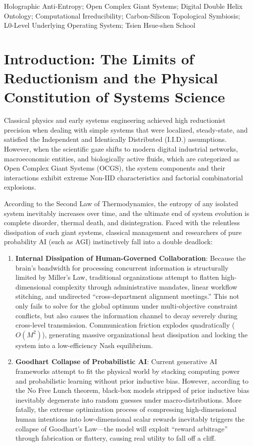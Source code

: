 \documentclass{article}
\begin{document}
\begin{keywords}
Holographic Anti-Entropy; Open Complex Giant Systems; Digital Double Helix Ontology; Computational Irreducibility; Carbon-Silicon Topological Symbiosis; L0-Level Underlying Operating System; Tsien Hsue-shen School
\end{keywords}

\section{Introduction: The Limits of Reductionism and the Physical Constitution of Systems Science}
\label{intro}

Classical physics and early systems engineering achieved high reductionist precision when dealing with simple systems that were localized, steady-state, and satisfied the Independent and Identically Distributed (I.I.D.) assumptions. However, when the scientific gaze shifts to modern digital industrial networks, macroeconomic entities, and biologically active fluids, which are categorized as Open Complex Giant Systems (OCGS), the system components and their interactions exhibit extreme Non-IID characteristics and factorial combinatorial explosions.

According to the Second Law of Thermodynamics, the entropy of any isolated system inevitably increases over time, and the ultimate end of system evolution is complete disorder, thermal death, and disintegration. Faced with the relentless dissipation of such giant systems, classical management and researchers of pure probability AI (such as AGI) instinctively fall into a double deadlock:
\begin{enumerate}
    \item \textbf{Internal Dissipation of Human-Governed Collaboration}: Because the brain's bandwidth for processing concurrent information is structurally limited by Miller's Law, traditional organizations attempt to flatten high-dimensional complexity through administrative mandates, linear workflow stitching, and undirected ``cross-department alignment meetings.'' This not only fails to solve for the global optimum under multi-objective constraint conflicts, but also causes the information channel to decay severely during cross-level transmission. Communication friction explodes quadratically ($O(M^2)$), generating massive organizational heat dissipation and locking the system into a low-efficiency Nash equilibrium.
    \item \textbf{Goodhart Collapse of Probabilistic AI}: Current generative AI frameworks attempt to fit the physical world by stacking computing power and probabilistic learning without prior inductive bias. However, according to the No Free Lunch theorem, black-box models stripped of prior inductive bias inevitably degenerate into random guesses under macro-distributions. More fatally, the extreme optimization process of compressing high-dimensional human intentions into low-dimensional scalar rewards inevitably triggers the collapse of Goodhart's Law---the model will exploit ``reward arbitrage'' through fabrication or flattery, causing real utility to fall off a cliff.
\end{enumerate}
\end{document}
